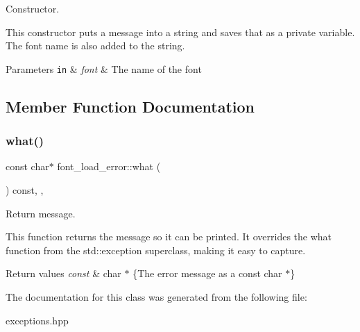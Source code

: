 Constructor. 

This constructor puts a message into a string and saves that as a private variable. The font name is also added to the string.


\begin{DoxyParams}[1]{Parameters}
\mbox{\tt in}  & {\em font} & The name of the font \\
\hline
\end{DoxyParams}


\subsection{Member Function Documentation}
\mbox{\label{classfont__load__error_a17c3014c5953ab5863585e4cbf8865c3}} 
\subsubsection{\texorpdfstring{what()}{what()}}
{\footnotesize\ttfamily const char$\ast$ font\+\_\+load\+\_\+error\+::what (\begin{DoxyParamCaption}{ }\end{DoxyParamCaption}) const\hspace{0.3cm}{\ttfamily [inline]}, {\ttfamily [override]}, {\ttfamily [noexcept]}}



Return message. 

This function returns the message so it can be printed. It overrides the what function from the std\+::exception superclass, making it easy to capture.


\begin{DoxyRetVals}{Return values}
{\em const} & char $\ast$ \{The error message as a const char $\ast$\} \\
\hline
\end{DoxyRetVals}


The documentation for this class was generated from the following file\+:\begin{DoxyCompactItemize}
\item 
exceptions.\+hpp\end{DoxyCompactItemize}
